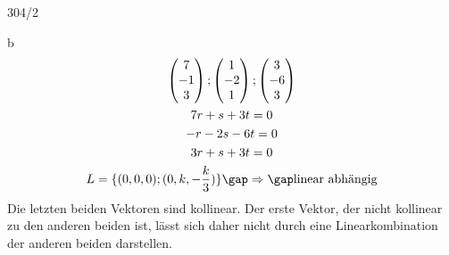 \begin{exercise}{304/2}
  \item [b]
  \begin{gather*}
    \begin{pmatrix}7 \\ -1 \\ 3\end{pmatrix}; \begin{pmatrix}1 \\ -2 \\ 1\end{pmatrix}; \begin{pmatrix}3 \\ -6 \\ 3\end{pmatrix} \\
    7r + s + 3t = 0 \\
    -r - 2s -6t = 0 \\
    3r + s + 3t = 0 \\
    L = \{(0, 0, 0); (0, k, -\frac{k}{3})\} \gap\Rightarrow\gap \text{linear abhängig}
  \end{gather*}
  Die letzten beiden Vektoren sind kollinear. Der erste Vektor, der nicht kollinear zu den anderen beiden ist, lässt sich daher nicht durch eine Linearkombination der anderen beiden darstellen.
\end{exercise}



